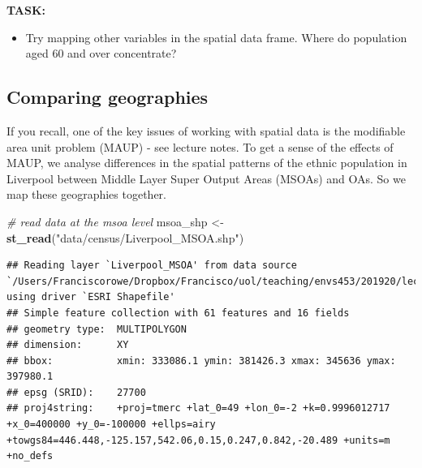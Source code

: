 \documentclass[]{book}
\newenvironment{Shaded}{\begin{snugshade}}{\end{snugshade}}
\newcommand{\KeywordTok}[1]{\textcolor[rgb]{0.13,0.29,0.53}{\textbf{#1}}}
\newcommand{\StringTok}[1]{\textcolor[rgb]{0.31,0.60,0.02}{#1}}
\newcommand{\CommentTok}[1]{\textcolor[rgb]{0.56,0.35,0.01}{\textit{#1}}}
\newcommand{\NormalTok}[1]{#1}
\providecommand{\tightlist}{%
  \setlength{\itemsep}{0pt}\setlength{\parskip}{0pt}}
\begin{document}
\textbf{TASK:}

\begin{itemize}
\tightlist
\item
  Try mapping other variables in the spatial data frame. Where do
  population aged 60 and over concentrate?
\end{itemize}

\subsection{Comparing geographies}\label{comparing-geographies}

If you recall, one of the key issues of working with spatial data is the
modifiable area unit problem (MAUP) - see lecture notes. To get a sense
of the effects of MAUP, we analyse differences in the spatial patterns
of the ethnic population in Liverpool between Middle Layer Super Output
Areas (MSOAs) and OAs. So we map these geographies together.

\begin{Shaded}
\begin{Highlighting}[]
\CommentTok{# read data at the msoa level}
\NormalTok{msoa_shp <-}\StringTok{ }\KeywordTok{st_read}\NormalTok{(}\StringTok{"data/census/Liverpool_MSOA.shp"}\NormalTok{)}
\end{Highlighting}
\end{Shaded}

\begin{verbatim}
## Reading layer `Liverpool_MSOA' from data source `/Users/Franciscorowe/Dropbox/Francisco/uol/teaching/envs453/201920/lectures/san/data/census/Liverpool_MSOA.shp' using driver `ESRI Shapefile'
## Simple feature collection with 61 features and 16 fields
## geometry type:  MULTIPOLYGON
## dimension:      XY
## bbox:           xmin: 333086.1 ymin: 381426.3 xmax: 345636 ymax: 397980.1
## epsg (SRID):    27700
## proj4string:    +proj=tmerc +lat_0=49 +lon_0=-2 +k=0.9996012717 +x_0=400000 +y_0=-100000 +ellps=airy +towgs84=446.448,-125.157,542.06,0.15,0.247,0.842,-20.489 +units=m +no_defs
\end{verbatim}
\end{document}
